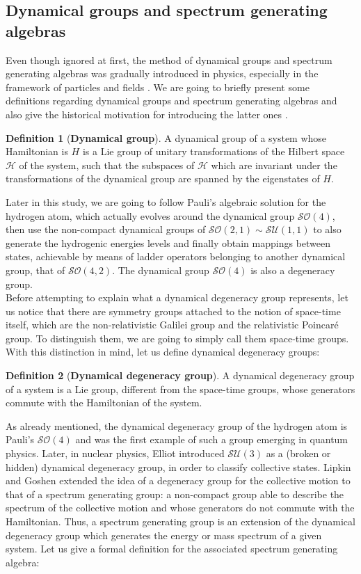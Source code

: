 \documentclass[12pt,a4paper]{report}
\theoremstyle{definition}
\newtheorem{definition}{Definition}
\theoremstyle{remark}
\theoremstyle{remark}
\begin{document}
\subsection{Dynamical groups and spectrum generating algebras}
Even though ignored at first, the method of dynamical groups and spectrum generating algebras was gradually introduced in physics, especially in the framework of particles and fields \cite{bohmbarut}. We are going to briefly present some definitions regarding dynamical groups and spectrum generating algebras \cite{rowesga} and also give the historical motivation for introducing the latter ones \cite{bohmdg}. 
\begin{definition}[\textbf{Dynamical group}]
A dynamical group of a system whose Hamiltonian is $H$ is a Lie group of unitary transformations of the Hilbert space $\mathcal{H}$ of the system, such that the subspaces of $\mathcal{H}$ which are invariant under the transformations of the dynamical group are spanned by the
eigenstates of $H$.
\end{definition} \indent
Later in this study, we are going to follow Pauli's algebraic solution for the hydrogen atom, which actually evolves around the dynamical group $\mathcal{SO}(4)$, then use the non-compact dynamical groups of $\mathcal{SO}(2,1)\sim\mathcal{SU}(1,1)$ to also generate the hydrogenic energies levels and finally obtain mappings between states, achievable by means of ladder operators belonging to another dynamical group, that of $\mathcal{SO}(4,2)$. The dynamical group $\mathcal{SO}(4)$ is also a degeneracy group. \\ \indent
Before attempting to explain what a dynamical degeneracy group represents, let us notice that there are symmetry groups attached to the notion of space-time itself, which are the non-relativistic Galilei group and the relativistic Poincaré group. To distinguish them, we are going to simply call them space-time groups. With this distinction in mind, let us define dynamical degeneracy groups:
\begin{definition}[\textbf{Dynamical degeneracy group}]
A dynamical degeneracy group of a system is a Lie group, different from the space-time groups, whose generators commute with the Hamiltonian of the system. 
\end{definition}
As already mentioned, the dynamical degeneracy group of the hydrogen atom is Pauli's $\mathcal{SO}(4)$ and was the first example of such a group emerging in quantum physics. Later, in nuclear physics, Elliot introduced $\mathcal{SU}(3)$ as a (broken or hidden) dynamical degeneracy group, in order to classify collective states. Lipkin and Goshen extended the idea of a degeneracy group for the collective motion to that of a spectrum generating group: a non-compact group able to describe the spectrum of the collective motion and whose generators do not commute with the Hamiltonian. Thus, a spectrum generating group is an extension of the dynamical degeneracy group which generates the energy or mass spectrum of a given system. Let us give a formal definition for the associated spectrum generating algebra:
\end{document}
